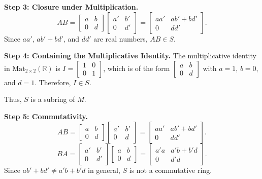 \documentclass[12pt]{amsart}
\theoremstyle{definition}
\numberwithin{equation}{section}
\newcommand{\R}{\mathbb{R}}
\begin{document}
\begin{exercise}{7}
    \noindent \textbf{Step 3: Closure under Multiplication.}
    \[
    AB = \begin{bmatrix} a & b \\ 0 & d \end{bmatrix} \begin{bmatrix} a' & b' \\ 0 & d' \end{bmatrix} = \begin{bmatrix} aa' & ab' + bd' \\ 0 & dd' \end{bmatrix}.
    \]
    Since \(aa'\), \(ab' + bd'\), and \(dd'\) are real numbers, \(AB \in S\).

    \noindent \textbf{Step 4: Containing the Multiplicative Identity.}
    The multiplicative identity in \(\text{Mat}_{2 \times 2}(\R)\) is \(I = \begin{bmatrix} 1 & 0 \\ 0 & 1 \end{bmatrix}\), which is of the form \(\begin{bmatrix} a & b \\ 0 & d \end{bmatrix}\) with \(a = 1\), \(b = 0\), and \(d = 1\). Therefore, \(I \in S\).

    Thus, \(S\) is a subring of \(M\).

    \noindent \textbf{Step 5: Commutativity.}
    \[
    AB = \begin{bmatrix} a & b \\ 0 & d \end{bmatrix} \begin{bmatrix} a' & b' \\ 0 & d \end{bmatrix} = \begin{bmatrix} aa' & ab' + bd' \\ 0 & dd' \end{bmatrix}.
    \]
    \[
    BA = \begin{bmatrix} a' & b' \\ 0 & d' \end{bmatrix} \begin{bmatrix} a & b \\ 0 & d \end{bmatrix} = \begin{bmatrix} a'a & a'b + b'd \\ 0 & d'd \end{bmatrix}.
    \]
    Since \(ab' + bd' \neq a'b + b'd\) in general, \(S\) is not a commutative ring.


\end{exercise}
\end{document}
